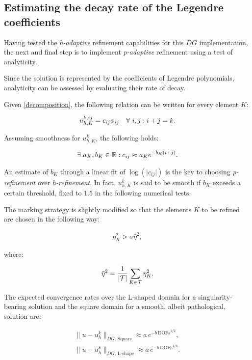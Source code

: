 \subsection{Estimating the decay rate of the Legendre coefficients}

Having tested the \textit{h-adaptive} refinement capabilities for this $DG$ implementation, the next and final step is to implement \textit{p-adaptive} refinement using a test of analyticity.

\cite{Eibner2007} Since the solution is represented by the coefficients of Legendre polynomials, analyticity can be assessed by evaluating their rate of decay.

Given \eqref{decomposition}, the following relation can be written for every element $K$:

\begin{gather}
    u^{k, ij}_{h, K} = c_{ij} \phi_{ij} \quad \forall ~ i, j : i + j = k.
\end{gather}

Assuming smoothness for $u^k_{h, K}$, the following holds:

\begin{gather}
    \exists ~ a_K, b_K \in \mathbb{R} : c_{ij} \approx a_K e^{-b_K (i + j)}.
\end{gather}

An estimate of $b_K$ through a linear fit of $\log(\lvert c_{ij} \rvert)$ is the key to choosing \textit{p-refinement} over \textit{h-refinement}. In fact, $u^k_{h, K}$ is said to be smooth if $b_K$ exceeds a certain threshold, fixed to $1.5$ in the following numerical tests.

The marking strategy is slightly modified so that the elements $K$ to be refined are chosen in the following way:

\begin{gather}
    \eta_K^2 > \sigma \bar{\eta}^2,
\end{gather}

where:

\begin{gather}
    \bar{\eta}^2 = \frac{1}{\lvert \mathcal{T} \rvert} \sum_{K \in \mathcal{T}} \eta_K^2.
\end{gather}

\cite{Eibner2007} The expected convergence rates over the L-shaped domain for a singularity-bearing solution and the square domain for a smooth, albeit pathological, solution are:

\begin{gather}
    \lVert u - u^k_h \rVert_{DG, \, \text{Square}} \approx a \, e^{-b \, \text{DOFs}^{1/2}}, \\
    \lVert u - u^k_h \rVert_{DG, \, \text{L-shape}} \approx a \, e^{-b \, \text{DOFs}^{1/3}}.
\end{gather}

